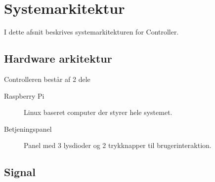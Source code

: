 \section{Systemarkitektur}

I dette afsnit beskrives systemarkitekturen for Controller.

\subsection{Hardware arkitektur}


Controlleren består af 2 dele
\begin{description}
\item[Raspberry Pi] Linux baseret computer der styrer hele systemet. 
\item[Betjeningspanel] Panel med 3 lysdioder og 2 trykknapper til brugerinteraktion.
\end{description}

\subsection{Signal}

